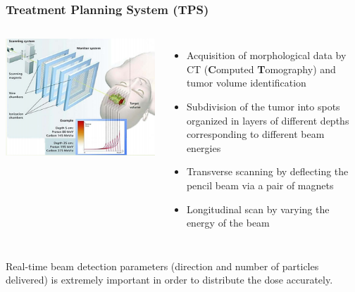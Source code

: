 \documentclass[aspectratio=169]{beamer}
\begin{document}
	\begin{frame}
		\frametitle{Treatment Planning System (TPS)}
		\begin{columns}
			\includegraphics[width=0.95 \textwidth]{IMG/Beam_Monitoring.PNG}
			\begin{itemize}
				\item Acquisition of morphological data by CT (\textbf{C}omputed \textbf{T}omography) and tumor volume identification
				\item Subdivision of the tumor into spots organized in layers of different depths corresponding to different beam energies
				\item Transverse scanning by deflecting the pencil beam via a pair of magnets
				\item Longitudinal scan by varying the energy of the beam
			\end{itemize}
		\end{columns}
	\vspace{0.2 cm}
	{\color{blue} Real-time beam detection parameters (direction and number of particles delivered) \newline is extremely important in order to distribute the dose accurately.}
	\end{frame}
\end{document}

